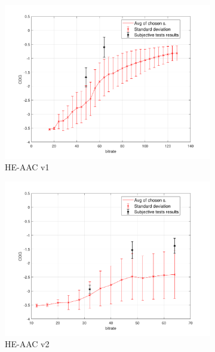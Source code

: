 \begin{figure}[h]
\begin{subfigure}{.5\textwidth}
        \centering
        \includegraphics[width=1\linewidth]{pic/objective/heAdvanced.pdf}
        \caption{HE-AAC v1}
        \label{app:sub3}
    \end{subfigure}%
        \begin{subfigure}{.5\textwidth}
        \centering
        \includegraphics[width=1\linewidth]{pic/objective/hev2Advanced.pdf}
        \caption{HE-AAC v2}
        \label{app:adv:sub4}
    \end{subfigure}%
        \\
        \begin{subfigure}{.5\textwidth}
        \centering

\end{subfigure}
\end{figure}

